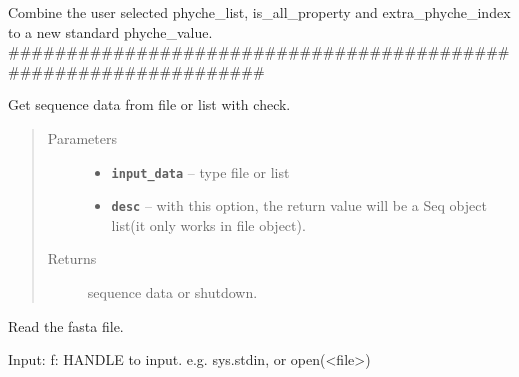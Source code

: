 \documentclass[letterpaper,10pt,english]{sphinxmanual}
\begin{document}
\begin{fulllineitems}
\label{reference/PyDNAutil:PyDNAutil.GeneratePhycheValue}
Combine the user selected phyche\_list, is\_all\_property and 
extra\_phyche\_index to a new standard phyche\_value.
\#\#\#\#\#\#\#\#\#\#\#\#\#\#\#\#\#\#\#\#\#\#\#\#\#\#\#\#\#\#\#\#\#\#\#\#\#\#\#\#\#\#\#\#\#\#\#\#\#\#\#\#\#\#\#\#\#\#\#\#\#\#\#\#\#

\end{fulllineitems}


\begin{fulllineitems}
\label{reference/PyDNAutil:PyDNAutil.GetData}
Get sequence data from file or list with check.
\begin{quote}\begin{description}
\item[{Parameters}] \leavevmode\begin{itemize}
\item {} 
\textbf{\texttt{input\_data}} -- type file or list

\item {} 
\textbf{\texttt{desc}} -- with this option, the return value will be a Seq object list(it only works in file object).

\end{itemize}

\item[{Returns}] \leavevmode
sequence data or shutdown.

\end{description}\end{quote}

\end{fulllineitems}


\begin{fulllineitems}
\label{reference/PyDNAutil:PyDNAutil.GetSequenceCheckDna}
Read the fasta file.

Input: f: HANDLE to input. e.g. sys.stdin, or open(\textless{}file\textgreater{})

\end{fulllineitems}
\end{document}
